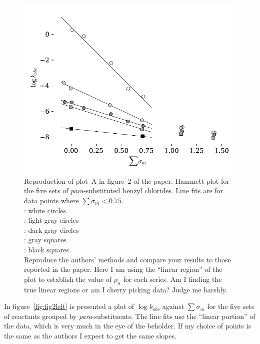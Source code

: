 \documentclass{tufte-handout}
\begin{document}
\begin{figure}[h!]
  \centering
  \includegraphics[scale=0.8]{images/plot1.pdf}
  \caption[-0mm]{Reproduction of plot~A in figure~2 of the paper. Hammett plot for the five sets of \textit{para}-substituted benzyl chlorides. Line fits are for data points where $\sum \sigma_m < 0.75$. \vspace{2mm} \\ 
  : white circles  \\
  : light gray circles  \\
  : dark gray circles  \\
  : gray squares   \\
  : black squares  \\
  
   \vspace{20mm} {} Reproduce the authors' methods and compare your results to those reported in the paper. Here I am using the ``linear region'' of the plot to establish the value of $\rho_n$ for each series. Am I finding the true linear regions or am I cherry picking data? Judge me harshly.
 } 
  \label{fig:fig2left}
\end{figure}

\clearpage
In figure~\vref{fig:fig2left} is presented a plot of $\log{k_{obs}}$ against $\sum \sigma_m$ for the five sets of reactants grouped by \textit{para}-substituents. The line fits use the ``linear portion'' of the data, which is very much in the eye of the beholder. If my choice of points is the same as the authors I expect to get the same slopes.
\end{document}
